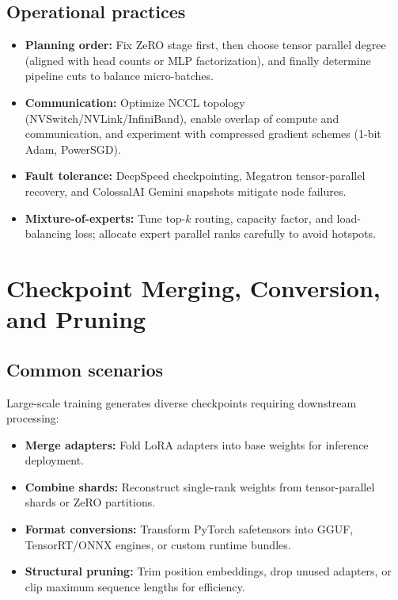 \documentclass{article}
\begin{document}
\subsection{Operational practices}
\begin{itemize}
  \item \textbf{Planning order:} Fix ZeRO stage first, then choose tensor parallel degree (aligned with head counts or MLP factorization), and finally determine pipeline cuts to balance micro-batches.
  \item \textbf{Communication:} Optimize NCCL topology (NVSwitch/NVLink/InfiniBand), enable overlap of compute and communication, and experiment with compressed gradient schemes (1-bit Adam, PowerSGD).
  \item \textbf{Fault tolerance:} DeepSpeed checkpointing, Megatron tensor-parallel recovery, and ColossalAI Gemini snapshots mitigate node failures.
  \item \textbf{Mixture-of-experts:} Tune top-$k$ routing, capacity factor, and load-balancing loss; allocate expert parallel ranks carefully to avoid hotspots.
\end{itemize}

\section{Checkpoint Merging, Conversion, and Pruning}
\subsection{Common scenarios}
Large-scale training generates diverse checkpoints requiring downstream processing:
\begin{itemize}
  \item \textbf{Merge adapters:} Fold LoRA adapters into base weights for inference deployment.
  \item \textbf{Combine shards:} Reconstruct single-rank weights from tensor-parallel shards or ZeRO partitions.
  \item \textbf{Format conversions:} Transform PyTorch safetensors into GGUF, TensorRT/ONNX engines, or custom runtime bundles.
  \item \textbf{Structural pruning:} Trim position embeddings, drop unused adapters, or clip maximum sequence lengths for efficiency.
\end{itemize}
\end{document}
